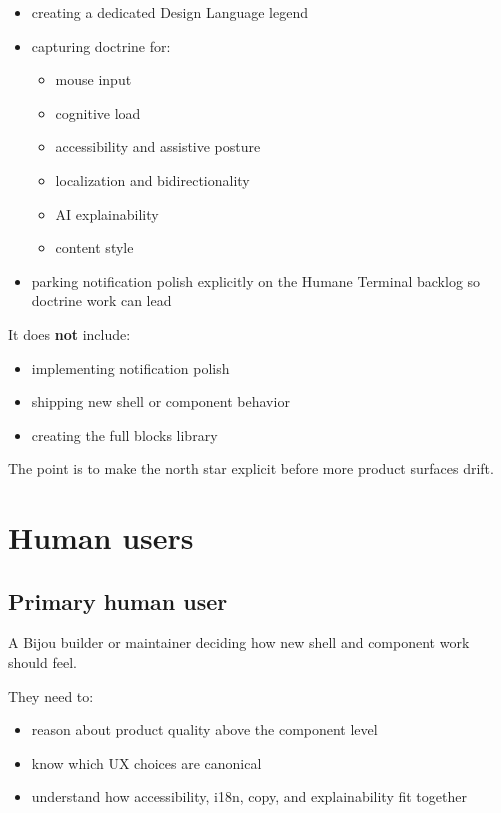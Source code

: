\begin{itemize}
\tightlist
\item
  creating a dedicated Design Language legend
\item
  capturing doctrine for:

  \begin{itemize}
  \tightlist
  \item
    mouse input
  \item
    cognitive load
  \item
    accessibility and assistive posture
  \item
    localization and bidirectionality
  \item
    AI explainability
  \item
    content style
  \end{itemize}
\item
  parking notification polish explicitly on the Humane Terminal backlog so doctrine work can lead
\end{itemize}

It does \textbf{not} include:

\begin{itemize}
\tightlist
\item
  implementing notification polish
\item
  shipping new shell or component behavior
\item
  creating the full blocks library
\end{itemize}

The point is to make the north star explicit before more product surfaces drift.

\section{Human users}\label{record-168-human-users}

\subsection{Primary human user}\label{record-168-primary-human-user}

A Bijou builder or maintainer deciding how new shell and component work should feel.

They need to:

\begin{itemize}
\tightlist
\item
  reason about product quality above the component level
\item
  know which UX choices are canonical
\item
  understand how accessibility, i18n, copy, and explainability fit together
\end{itemize}

